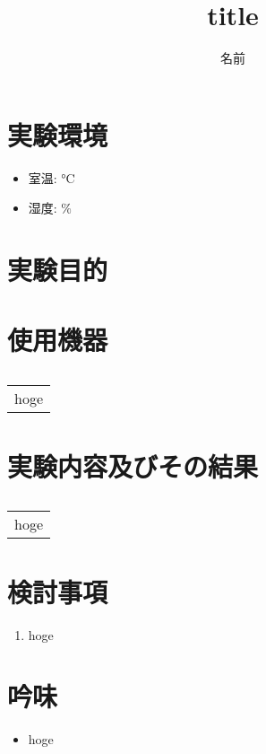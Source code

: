 \documentclass[uplatex, dvipdfmx, a4paper]{ujarticle}
\title{title}
\author{名前}
\date{\warekitoday}
\begin{document}
\section{実験環境}
\begin{itemize}
  \item 室温: $\si{\degreeCelsius}$
  \item 湿度: $\%$
\end{itemize}

\section{実験目的}

\section{使用機器}
\begin{table}[H]
  \centering
  \caption{}
  \label{tab:machinary}
  \begin{tabular}{|c|} \hline
    hoge \\
  \end{tabular}
\end{table}

\section{実験内容及びその結果}

\begin{table}[H]
  \centering
  \caption{}
  \label{tab:}
  \begin{tabular}{|c|} \hline
    hoge \\
  \end{tabular}
\end{table}

\begin{figure}[H]
  \centering
  \caption{}
  \label{fig:}
\end{figure}

\section{検討事項}
\begin{enumerate}
  \item{hoge}
\end{enumerate}

\section{吟味}
\begin{itemize}
  \item{hoge}
\end{itemize}



\end{document}
